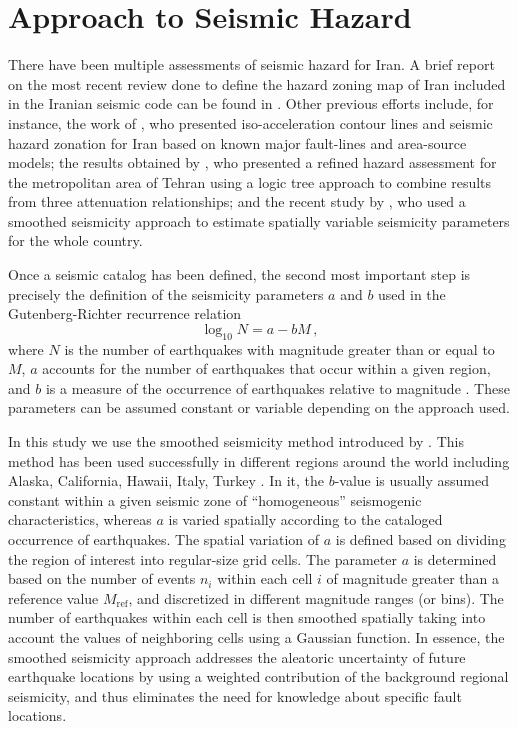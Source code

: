 
\section{Approach to Seismic Hazard}

There have been multiple assessments of seismic hazard for Iran. A brief report on the most recent review done to define the hazard zoning map of Iran included in the Iranian seismic code \citep{BHRC2014} can be found in \citet{Moinfar_2012_WCEE}. Other previous efforts include, for instance, the work of \citet{Tavakoli1999}, who presented iso-acceleration contour lines and seismic hazard zonation for Iran based on known major fault-lines and area-source models; the results obtained by \citet{Ghodrati2003}, who presented a refined hazard assessment for the metropolitan area of Tehran using a logic tree approach to combine results from three attenuation relationships; and the recent study by \citet{Khodaverdian_2016_BSSA}, who used a smoothed seismicity approach to estimate spatially variable seismicity parameters for the whole country.

Once a seismic catalog has been defined, the second most important step is precisely the definition of the seismicity parameters $a$ and $b$ used in the Gutenberg-Richter recurrence relation 
% 
\begin{equation}
	\log_{10} N = a - b M \, ,
\end{equation}
% 
\noindent
where $N$ is the number of earthquakes with magnitude greater than or equal to $M$, $a$ accounts for the number of earthquakes that occur within a given region, and $b$ is a measure of the occurrence of earthquakes relative to magnitude \citep{Gutenberg1944}. These parameters can be assumed constant or variable depending on the approach used. 

In this study we use the smoothed seismicity method introduced by \citet{Frankel1995}. This method has been used successfully in different regions around the world including Alaska, California, Hawaii, Italy, Turkey \citep[e.g.,][]{Cao1996, Klein2001, Akinci2004, Kalkan2009, Moschetti2014}. In it, the $b$-value is usually assumed constant within a given seismic zone of ``homogeneous'' seismogenic characteristics, whereas $a$ is varied spatially according to the cataloged occurrence of earthquakes. The spatial variation of $a$ is defined based on dividing the region of interest into regular-size grid cells. The parameter $a$ is determined based on the number of events $n_i$ within each cell $i$ of magnitude greater than a reference value $M_{\mathrm{ref}}$, and discretized in different magnitude ranges (or bins). The number of earthquakes within each cell is then smoothed spatially taking into account the values of neighboring cells using a Gaussian function. In essence, the smoothed seismicity approach addresses the aleatoric uncertainty of future earthquake locations by using a weighted contribution of the background regional seismicity, and thus eliminates the need for knowledge about specific fault locations.

